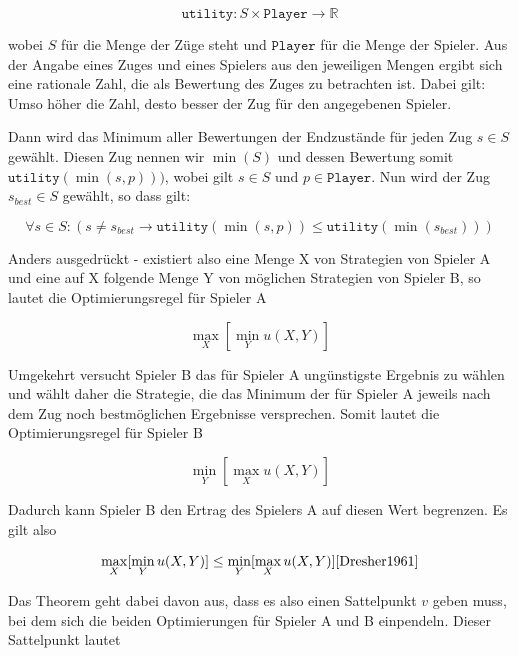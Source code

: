\begin{equation}
\mathtt{utility}: S \times \mathtt{Player} \rightarrow \mathbb{R}
\end{equation}

wobei $S$ für die Menge der Züge steht und $\mathtt{Player}$ für die Menge der Spieler. Aus der Angabe eines Zuges und eines Spielers aus den jeweiligen Mengen ergibt sich eine rationale Zahl, die als Bewertung des Zuges zu betrachten ist. Dabei gilt: Umso höher die Zahl, desto besser der Zug für den angegebenen Spieler.

Dann wird das Minimum aller Bewertungen der Endzustände für jeden Zug $s \in S$ gewählt. Diesen Zug nennen wir $\min (S)$ und dessen Bewertung somit $\mathtt{utility}(\min (s, p)))$, wobei gilt $s \in S$ und $p \in \mathtt{Player}$. Nun wird der Zug $s_{best} \in S$ gewählt, so dass gilt:

\begin{equation}
\forall s \in S : (s \neq s_{best} \rightarrow \mathtt{utility}(\min(s, p)) \leq \mathtt{utility}(\min(s_{best})))
\end{equation}

Anders ausgedrückt - existiert also eine Menge X von Strategien von Spieler A und eine auf X folgende Menge Y von möglichen Strategien von Spieler B, so lautet die Optimierungsregel für Spieler A

\begin{equation}
\max\limits_X[\min\limits_Yu(X,Y)]
\end{equation}

Umgekehrt versucht Spieler B das für Spieler A ungünstigste Ergebnis zu wählen und wählt daher die Strategie, die das Minimum der für Spieler A jeweils nach dem Zug noch bestmöglichen Ergebnisse versprechen. Somit lautet die Optimierungsregel für Spieler B

\begin{equation}
\min\limits_Y[\max\limits_Xu(X,Y)]
\end{equation}


Dadurch kann Spieler B den Ertrag des Spielers A auf diesen Wert begrenzen. Es gilt also

\begin{equation}
\max\limits_X[\min\limits_Yu(X,Y)] \leq \min\limits_Y[\max\limits_Xu(X,Y)] \cite{Dresher1961}
\end{equation}

Das Theorem geht dabei davon aus, dass es also einen Sattelpunkt $v$ geben muss, bei dem sich die beiden Optimierungen für Spieler A und B einpendeln. Dieser Sattelpunkt lautet


